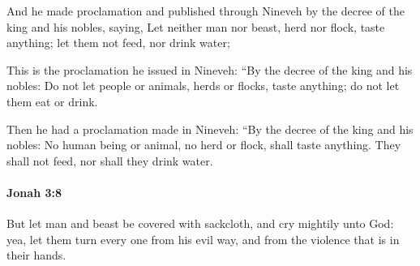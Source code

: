 			\begin{versebox}
					\item[BHS] 
					\item[LXX] 
					\item[ASV] And he made proclamation and published through Nineveh by the decree of the king and his nobles, saying, Let neither man nor beast, herd nor flock, taste anything; let them not feed, nor drink water;
					\item[NIV] This is the proclamation he issued in Nineveh: “By the decree of the king and his nobles: Do not let people or animals, herds or flocks, taste anything; do not let them eat or drink.
					\item[NRSV] Then he had a proclamation made in Nineveh: “By the decree of the king and his nobles: No human being or animal, no herd or flock, shall taste anything. They shall not feed, nor shall they drink water.
			\end{versebox}

		\paragraph{Jonah 3:8} %
			\label{JONAH-3-8}

			But let man and beast be covered with sackcloth, and cry mightily unto God: yea, let them turn every one from his evil way, and from the violence that is in their hands.

